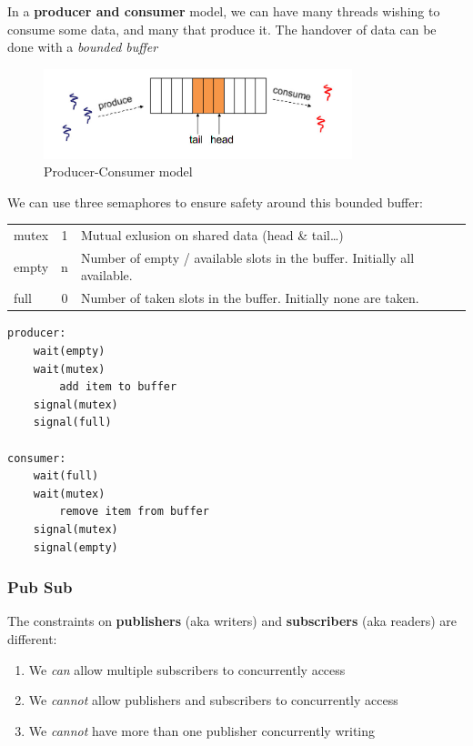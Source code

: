 \documentclass{article}
\begin{document}
In a \textbf{producer and consumer} model, we can have many threads
wishing to consume some data, and many that produce it. The handover of
data can be done with a \emph{bounded buffer}

\begin{figure}[h!]
  \centering
  \includegraphics[width=0.8\textwidth]{produceConsume}
  \caption{Producer-Consumer model}
\end{figure}


We can use three semaphores to ensure safety around this bounded buffer:

\begin{tabular}{l | c | l }
mutex & 1 & Mutual exlusion on shared data (head \& tail\ldots{})\\
empty & n & Number of empty / available slots in the buffer. Initially all available.\\
full  & 0 & Number of taken slots in the buffer. Initially none are taken.
\end{tabular}

\begin{verbatim}
producer:
    wait(empty)
    wait(mutex)
        add item to buffer
    signal(mutex)
    signal(full)

consumer:
    wait(full)
    wait(mutex)
        remove item from buffer
    signal(mutex)
    signal(empty)
\end{verbatim}

\subsubsection{Pub Sub}\label{pub-sub}

The constraints on \textbf{publishers} (aka writers) and
\textbf{subscribers} (aka readers) are different:

\begin{enumerate}
\item
  We \emph{can} allow multiple subscribers to concurrently access
\item
  We \emph{cannot} allow publishers and subscribers to concurrently
  access
\item
  We \emph{cannot} have more than one publisher concurrently writing
\end{enumerate}
\end{document}
